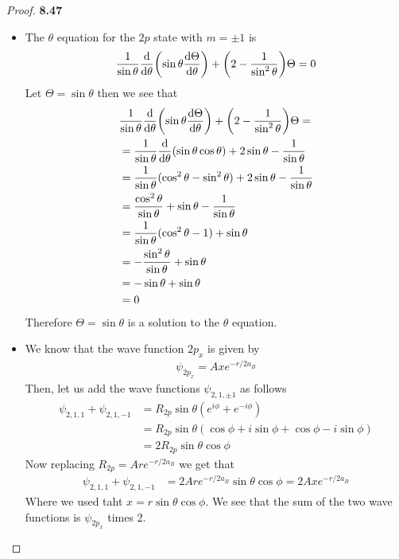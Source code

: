 \documentclass[11pt]{article}
\theoremstyle{definition}
\begin{document}
\cleardoublepage
\begin{proof}{\textbf{8.47}}\\
\begin{itemize}
\item [\textbf{(a)}] The $\theta$ equation for the $2p$ state with $m = \pm 1$
is
\begin{align*}
    \frac{1}{\sin\theta}\dv{\theta}(\sin\theta\dv{\Theta}{\theta})
    + \bigg(2-\frac{1}{\sin^2\theta}\bigg)\Theta = 0
\end{align*}
Let $\Theta = \sin\theta$ then we see that
\begin{align*}
    &\frac{1}{\sin\theta}\dv{\theta}(\sin\theta\dv{\Theta}{\theta})
    + \bigg(2-\frac{1}{\sin^2\theta}\bigg)\Theta =\\
    &= \frac{1}{\sin\theta}\dv{\theta}(\sin\theta\cos\theta)
    + 2\sin\theta-\frac{1}{\sin\theta}\\
    &= \frac{1}{\sin\theta}(\cos^2\theta - \sin^2\theta)
    + 2\sin\theta-\frac{1}{\sin\theta}\\
    &= \frac{\cos^2\theta}{\sin\theta} + \sin\theta-\frac{1}{\sin\theta}\\
    &= \frac{1}{\sin\theta}(\cos^2\theta - 1 ) + \sin\theta\\
    &= -\frac{\sin^2\theta}{\sin\theta} + \sin\theta\\
    &= -\sin\theta + \sin\theta\\
    &= 0
\end{align*}
Therefore $\Theta = \sin\theta$ is a solution to the $\theta$ equation.

\item [\textbf{(b)}] We know that the wave function $2p_x$ is given by
\begin{align*}
    \psi_{2p_x} = Axe^{-r/2a_B}
\end{align*}
Then, let us add the wave functions $\psi_{2,1,\pm 1}$ as follows
\begin{align*}
\psi_{2,1,1} + \psi_{2,1,-1} &= R_{2p}\sin\theta(e^{i\phi} + e^{-i\phi})\\
    &= R_{2p}\sin\theta(\cos\phi + i\sin\phi + \cos\phi - i\sin\phi)\\
    &= 2R_{2p}\sin\theta\cos\phi
\end{align*}
Now replacing $R_{2p} = Are^{-r/2a_B}$ we get that
\begin{align*}
\psi_{2,1,1} + \psi_{2,1,-1}
    &= 2Are^{-r/2a_B}\sin\theta\cos\phi
    = 2Axe^{-r/2a_B}
\end{align*}
Where we used taht $x = r\sin\theta\cos\phi$. We see that the sum of the
two wave functions is $\psi_{2p_x}$ times 2.


\end{itemize}
\end{proof}
\end{document}
